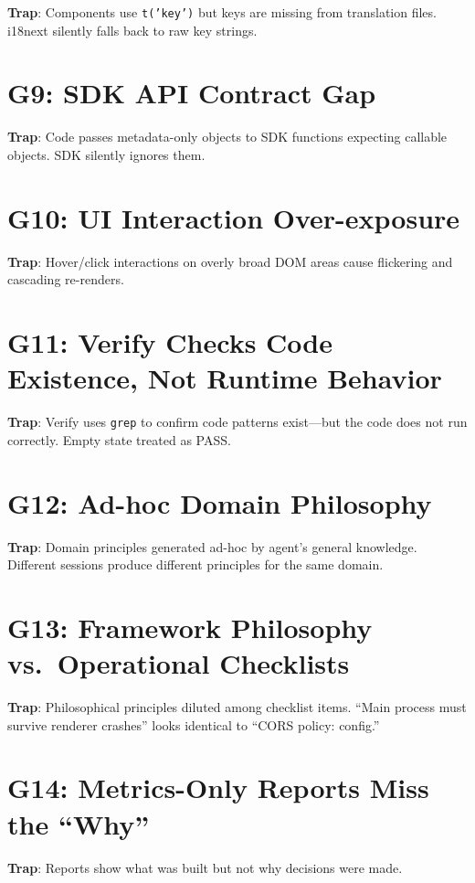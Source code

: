 \documentclass[11pt,a4paper,openright,twoside]{report}
\begin{document}
\textbf{Trap}: Components use \texttt{t('key')} but keys are missing from translation files. i18next silently falls back to raw key strings.

\section{G9: SDK API Contract Gap}

\textbf{Trap}: Code passes metadata-only objects to SDK functions expecting callable objects. SDK silently ignores them.

\section{G10: UI Interaction Over-exposure}

\textbf{Trap}: Hover/click interactions on overly broad DOM areas cause flickering and cascading re-renders.

\section{G11: Verify Checks Code Existence, Not Runtime Behavior}

\textbf{Trap}: Verify uses \texttt{grep} to confirm code patterns exist---but the code does not run correctly. Empty state treated as PASS.

\section{G12: Ad-hoc Domain Philosophy}

\textbf{Trap}: Domain principles generated ad-hoc by agent's general knowledge. Different sessions produce different principles for the same domain.

\section{G13: Framework Philosophy vs.\ Operational Checklists}

\textbf{Trap}: Philosophical principles diluted among checklist items. ``Main process must survive renderer crashes'' looks identical to ``CORS policy: config.''

\section{G14: Metrics-Only Reports Miss the ``Why''}

\textbf{Trap}: Reports show what was built but not why decisions were made.
\end{document}
